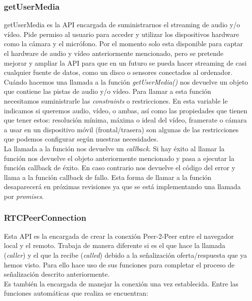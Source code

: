 \subsubsection{getUserMedia} 

getUserMedia es la API encargada de suministrarnos el streaming de audio y/o vídeo. Pide permiso al usuario para acceder y utilizar los dispositivos hardware como la cámara y el micrófono. Por el momento solo esta disponible para captar el hardware de audio y vídeo anteriormente mencionado, pero se pretende mejorar y ampliar la API para que en un futuro se pueda hacer streaming de casi cualquier fuente de datos, como un disco o sensores conectados al ordenador.\\

Cuándo hacemos una llamada a la función \textit{getUserMedia()} nos devuelve un objeto que contiene las pistas de audio y/o vídeo. Para llamar a esta función necesitamos suministrarle las \textit{constraints} o restricciones. En esta variable le indicamos si queremos audio, vídeo, o ambas, así como las propiedades que tienen que tener estos: resolución mínima, máxima o ideal del vídeo, framerate o cámara a usar en un dispositivo móvil (frontal/trasera) son algunas de las restricciones que podemos configurar según nuestras necesidades.\\

La llamada a la función nos devuelve un \textit{callback}. Si hay éxito al llamar la función nos devuelve el objeto anteriormente mencionado y pasa a ejecutar la función callback de éxito. En caso contrario nos devuelve el código del error y llama a la función callback de fallo. Esta forma de llamar a la función desaparecerá en próximas revisiones ya que se está implementando una llamada por \textit{promises}.\\


\subsubsection{RTCPeerConnection}

Esta API es la encargada de crear la conexión Peer-2-Peer entre el navegador local y el remoto. Trabaja de manera diferente si es el que hace la llamada (\textit{caller}) y el que la recibe (\textit{called}) debido a la señalización oferta/respuesta que ya hemos visto. Para ello hace uso de sus funciones para completar el proceso de señalización descrito anteriormente.\\

\noindent Es también la encargada de manejar la conexión una vez establecida. Entre las funciones automáticas que realiza se encuentran:\\

